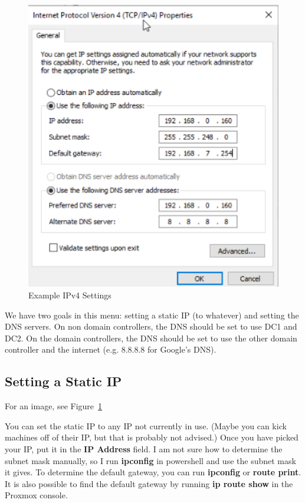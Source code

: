 \documentclass{article}
\begin{document}
\begin{figure}[]
        \centering
        \includegraphics[width=1\textwidth]{SampleDCIPv4.png}
        \caption{Example IPv4 Settings}
        \label{fig:IPv4Settings}
\end{figure}

We have two goals in this menu: setting a static IP (to whatever) and setting the DNS servers. 
On non domain controllers, the DNS should be set to use DC1 and DC2.
On the domain controllers, the DNS should be set to use the other domain controller and the internet (e.g. 8.8.8.8 for Google's DNS).

\subsection{Setting a Static IP}
For an image, see Figure~\ref{fig:IPv4Settings}

You can set the static IP to any IP not currently in use.
(Maybe you can kick machines off of their IP, but that is probably not advised.)
Once you have picked your IP, put it in the \textbf{IP Address} field.
I am not sure how to determine the subnet mask manually, so I run \textbf{ipconfig} in powershell
and use the subnet mask it gives.
To determine the default gateway, you can run \textbf{ipconfig} or \textbf{route print}.
It is also possible to find the default gateway by running \textbf{ip route show} in the Proxmox console. 
\end{document}
